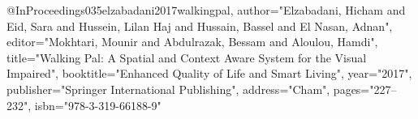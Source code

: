 @InProceedings{035elzabadani2017walkingpal,
author="Elzabadani, Hicham
and Eid, Sara
and Hussein, Lilan Haj
and Hussain, Bassel
and El Nasan, Adnan",
editor="Mokhtari, Mounir
and Abdulrazak, Bessam
and Aloulou, Hamdi",
title="Walking Pal: A Spatial and Context Aware System  for the Visual Impaired",
booktitle="Enhanced Quality of Life and Smart Living",
year="2017",
publisher="Springer International Publishing",
address="Cham",
pages="227--232",
isbn="978-3-319-66188-9"
}